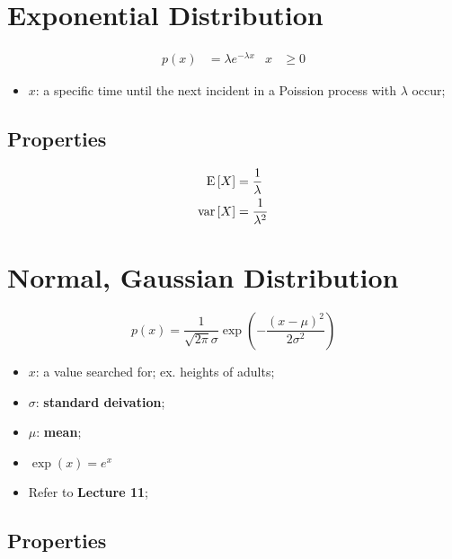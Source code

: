 \section{Exponential Distribution}

  \begin{align}
    p\left( x \right) &= \lambda e^{-\lambda x} & x &\ge 0
  \end{align}

  \begin{itemize}
    \item $ x $: a specific time until the next incident in a Poission process with $ \lambda $ occur;
  \end{itemize}
  
  \subsection{Properties}
  
    \begin{align}
      \operatorname{E}\left[ X \right] &= \frac{1}{\lambda} \\
      \operatorname{var}\left[ X \right] &= \frac{1}{\lambda^{2}}
    \end{align}

\section{Normal, Gaussian Distribution}
  
  \begin{equation}\label{eq: ch5-normal-dist}
    p \left( x \right) = \frac{1}{\sqrt{2\pi} \sigma} \exp \left( - \frac{\left( x - \mu \right)^{2}}{ 2\sigma^{2} } \right)
  \end{equation}
  
  \begin{itemize}
    \item $ x $: a value searched for; ex. heights of adults;
    \item $ \sigma $: \textbf{standard deivation};
    \item $ \mu $: \textbf{mean};
    \item $ \exp (x) = e^{x} $
    \item Refer to \textbf{Lecture 11};
  \end{itemize}
  
  \subsection{Properties}
  
